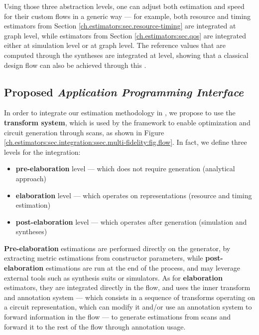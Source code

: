         Using those three abstraction levels, one can adjust both estimation  and speed for their custom flows in a generic way --- for example, both resource and timing estimators from Section \ref{ch.estimators:sec.resource-timing} are integrated at graph level, while  estimators from Section \ref{ch.estimators:sec.qos} are integrated either at simulation level or at graph level.
        The reference values that are computed through the syntheses are integrated at  level, showing that a classical design flow can also be achieved through this .

\clearpage
    \subsection[Proposed Application Programming Interface]{Proposed {\it Application Programming Interface}}
    \label{ch.estimators:sec.integration:ssec.api}

        In order to integrate our estimation methodology in \chisel{} , we propose to use the {\bf \firrtl{} transform system}, which is used by the framework to enable optimization and circuit generation through  scans, as shown in Figure \ref{ch.estimators:sec.integration:ssec.multi-fidelity:fig.flow}.
        In fact, we define three levels for the integration:
        \begin{itemize}
            \item {\bf pre-elaboration} level --- which does not require  generation (\eg analytical approach)
            \item {\bf elaboration} level --- which operates on \firrtl{} representations (\eg resource and timing estimation)
            \item {\bf post-elaboration} level --- which operates after  generation (\eg simulation and syntheses)
        \end{itemize}
        
        {\bf Pre-elaboration} estimations are performed directly on the generator, by extracting metric estimations from constructor parameters, while {\bf post-elaboration} estimations are run at the end of the  process, and may leverage external tools such as synthesis suits or simulators.
        As for {\bf elaboration} estimators, they are integrated directly in the \firrtl{} flow, and uses the inner transform and annotation system --- which consists in a sequence of transforms operating on a circuit representation, which can modify it and/or use an annotation system to forward information in the flow --- to generate estimations from  scans and forward it to the rest of the flow through annotation usage.

